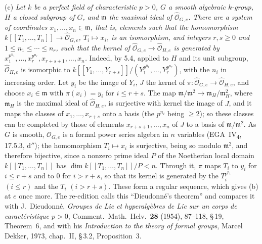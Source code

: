 \smallskip
\noindent(c) \emph{Let \(k\) be a perfect field of characteristic \(p>0\),
\(G\) a smooth algebraic \(k\)-group, \(H\) a closed subgroup of \(G\), and
\(\mathfrak m\) the maximal ideal of \(\widehat{\mathcal O}_{G,e}\). There
are a system of coordinates \(x_1,\ldots,x_n\in\mathfrak m\), that is,
elements such that the homomorphism
\(k[[T_1,\ldots,T_n]]\to\widehat{\mathcal O}_{G,e}\), \(T_i\mapsto x_i\),
is an isomorphism, and integers \(r,s\geq0\) and
\(1\leq n_1\leq\cdots\leq n_r\), such that the kernel of
\(\widehat{\mathcal O}_{G,e}\to\widehat{\mathcal O}_{H,e}\) is generated by
\(x_1^{p^{n_1}},\ldots,x_r^{p^{n_r}},x_{r+s+1},\ldots,x_n\).} Indeed, by
5.4, applied to \(H\) and its unit subgroup, \(\widehat{\mathcal O}_{H,e}\)
is isomorphic to
\(k[[Y_1,\ldots,Y_{r+s}]]/(Y_1^{p^{n_1}},\ldots,Y_r^{p^{n_r}})\), with the
\(n_i\) in increasing order. Let \(y_i\) be the image of \(Y_i\), \(J\) the
kernel of \(\pi:\widehat{\mathcal O}_{G,e}\to\widehat{\mathcal O}_{H,e}\),
and choose \(x_i\in\mathfrak m\) with \(\pi(x_i)=y_i\) for \(i\leq r+s\).
The map \(\mathfrak m/\mathfrak m^2\to\mathfrak m_H/\mathfrak m_H^2\),
where \(\mathfrak m_H\) is the maximal ideal of
\(\widehat{\mathcal O}_{H,e}\), is surjective with kernel the image of
\(J\), and it maps the classes of \(x_1,\ldots,x_{r+s}\) onto a basis (the
\(p^{n_i}\) being \(\geq2\)); so these classes can be completed by those
of elements \(x_{r+s+1},\ldots,x_n\) of \(J\) to a basis of
\(\mathfrak m/\mathfrak m^2\). As \(G\) is smooth,
\(\widehat{\mathcal O}_{G,e}\) is a formal power series algebra in \(n\)
variables (EGA~IV\textsubscript{4}, 17.5.3, \(\mathrm d''\)); the
homomorphism \(T_i\mapsto x_i\) is surjective, being so modulo
\(\mathfrak m^2\), and therefore bijective, since a nonzero prime ideal
\(P\) of the Noetherian local domain \(k[[T_1,\ldots,T_n]]\) has
\(\dim k[[T_1,\ldots,T_n]]/P<n\). Through it, \(\pi\) maps \(T_i\) to
\(y_i\) for \(i\leq r+s\) and to \(0\) for \(i>r+s\), so that its kernel is
generated by the \(T_i^{p^{n_i}}\) \((i\leq r)\) and the \(T_i\)
\((i>r+s)\). These form a regular sequence, which gives (b) at \(e\) once
more. The re-edition calls this ``Dieudonn\'e's theorem'' and compares it
with J.~Dieudonn\'e, \emph{Groupes de Lie et hyperalg\`ebres de Lie sur un
corps de caract\'eristique \(p>0\)}, Comment.\ Math.\ Helv.\ \textbf{28}
(1954), 87--118, \S\,19, Theorem~6, and with his \emph{Introduction to the
theory of formal groups}, Marcel Dekker, 1973, chap.~II, \S\,3.2,
Proposition~3.
